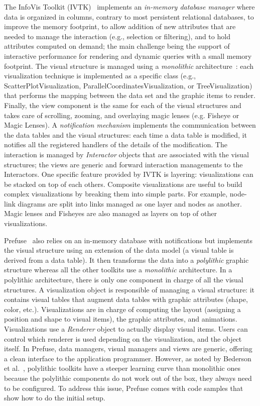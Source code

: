 The InfoVis Toolkit (IVTK)~\cite{InfoVis} implements an
\emph{in-memory database manager} where data is organized in columns,
contrary to most persistent relational databases, to improve the
memory footprint, to allow addition of new attributes that are needed
to manage the interaction (e.g., selection or filtering), and to hold
attributes computed on demand; the main challenge being the support of
interactive performance for rendering and dynamic queries with a small
memory footprint.  The visual structure is managed using a
\emph{monolithic} architecture~\cite{Polylithic}: each visualization
technique is implemented as a specific class (e.g.,
ScatterPlotVisualization, ParallelCoordinatesVisualization, or
TreeVisualization) that performs the mapping between the data set and
the graphic items to render.  Finally, the view component is the same
for each of the visual structures and takes care of scrolling,
zooming, and overlaying magic lenses (e.g. Fisheye or Magic Lenses).
A \emph{notification mechanism} implements the communication between
the data tables and the visual structures: each time a data table is
modified, it notifies all the registered handlers of the details of
the modification. The interaction is managed by \emph{Interactor}
objects that are associated with the visual structures; the views are
generic and forward interaction managements to the Interactors.  One
specific feature provided by IVTK is layering: visualizations can be
stacked on top of each others.  Composite visualizations are useful
to build complex visualizations by breaking them into simple
parts. For example, node-link diagrams are split into links managed as
one layer and nodes as another.  Magic lenses and Fisheyes are also
managed as layers on top of other visualizations.

Prefuse~\cite{Prefuse} also relies on an in-memory database with
notifications but implements the visual structure using an extension of
the data model (a visual table is derived from a data table).  It then
transforms the data into a \emph{polylithic} graphic structure whereas
all the other toolkits use a \emph{monolithic} architecture.  In a
polylithic architecture, there is only one component in charge of all
the visual structures.  A visualization object is responsible of
managing a visual structure: it contains visual tables that augment
data tables with graphic attributes (shape, color, etc.).
Visualizations are in charge of computing the layout (assigning a
position and shape to visual items), the graphic attributes, and
animations.  Visualizations use a \emph{Renderer} object to actually
display visual items.  Users can control which renderer is used
depending on the visualization, and the object itself.  In Prefuse,
data managers, visual managers and views are generic, offering a
clean interface to the application programmer.  However, as noted by
Bederson et al.~\cite{Polylithic}, polylithic toolkits have a steeper
learning curve than monolithic ones because the polylithic components
do not work out of the box, they always need to be configured.  To
address this issue, Prefuse comes with code samples that show how to
do the initial setup.

